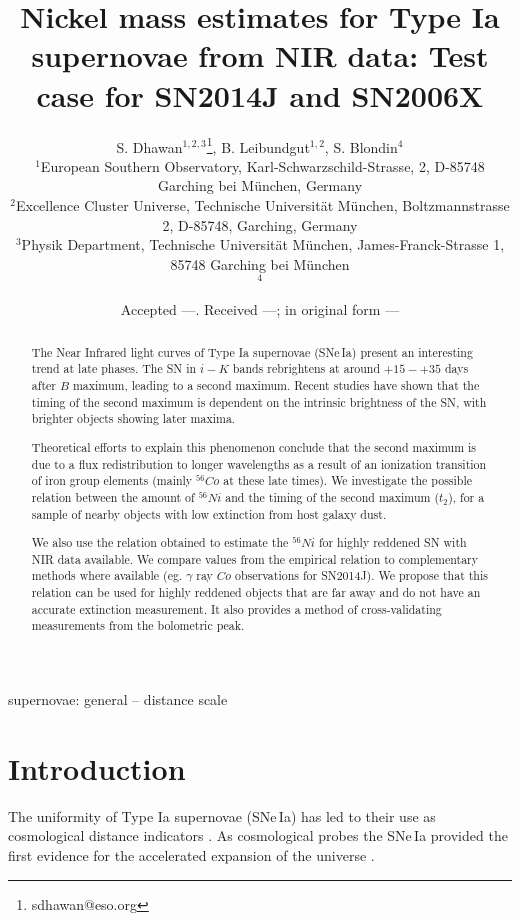 \documentclass[useAMS,usenatbib ]{mn2e}
\title[$M_{^{56}Ni}$ for SNIa from NIR data]{Nickel mass estimates for Type Ia supernovae from NIR data: Test case for SN2014J and SN2006X}
\author[S. Dhawan \emph{et al.}]{S. Dhawan$^{1,2,3}$\thanks{sdhawan@eso.org}, 
B. Leibundgut$^{1,2}$, S. Blondin$^4$\\%
$^1$European Southern Observatory, Karl-Schwarzschild-Strasse, 2, D-85748 Garching bei M\"unchen, Germany\\
$^2$Excellence Cluster Universe, Technische Universit\"at M\"unchen,
Boltzmannstrasse 2, D-85748, Garching, Germany\\
$^3$Physik Department, Technische Universit\"at M\"unchen, James-Franck-Strasse 1, 85748 Garching bei M\"unchen\\
$^4$ \\
}
\date{Accepted ---. Received ---; in original form ---}
\begin{document}
\maketitle
\label{firstpage}
%
\begin{abstract}

The Near Infrared light curves of Type Ia supernovae (SNe\,Ia) present an interesting
trend at late phases. The SN in $i-K$ bands rebrightens at around $+15-+35$ days after $B$ maximum,
leading to a second maximum. Recent studies have shown that the timing of the second maximum 
is dependent on the intrinsic brightness of the SN, with brighter objects showing later maxima. 

Theoretical efforts to explain this phenomenon conclude that the second maximum is due to a flux redistribution
to longer wavelengths as a result of an ionization transition of iron group elements (mainly {$^{56} Co$} at these late times).
We investigate the possible relation between the amount of $^{56} Ni$ and the timing of the second maximum ($t_2$), for a sample of nearby objects
with low extinction from host galaxy dust.  

We also use the relation obtained to estimate the $^{56} Ni$ for highly reddened SN with NIR data available. We compare values from the empirical relation
to complementary methods where available (eg. $\gamma$ ray $Co$ observations for SN2014J). We propose that this relation can be used for highly reddened objects 
that are far away and do not have an accurate extinction measurement. It also provides a method of cross-validating measurements from the bolometric peak.


\end{abstract}

\begin{keywords}
supernovae: general -- distance scale 
\end{keywords}


\section{Introduction}
\label{sec-intro}


The uniformity of Type Ia supernovae (SNe\,Ia) has led to their use as
cosmological distance indicators \citep[reviewed in:][]{Branch1992,Leibundgut2000,Hillebrandt2000}.  As
cosmological probes the SNe\,Ia provided the first evidence for the
accelerated expansion of the universe
\citep{Riess1998,Perlmutter1999}. 
\end{document}
